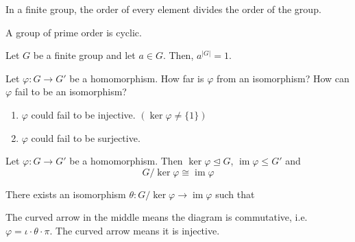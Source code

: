 \documentclass{mathnotes}
\DeclareMathOperator{\im}{im}
\begin{document}
\begin{cor}
  In a finite group, the order of every element divides the order of the group.
\end{cor}

\begin{cor}
  A group of prime order is cyclic.
\end{cor}

\begin{cor}
  Let $G$ be a finite group and let $a\in G$. Then, $a^{|G|}=1$.
\end{cor}

Let $\varphi:G\to G'$ be a homomorphism. How far is $\varphi$ from an
isomorphism? How can $\varphi$ fail to be an isomorphism?
\begin{enumerate}
  \item $\varphi$ could fail to be injective. $(\ker\varphi\ne\{1\})$
  \item $\varphi$ could fail to be surjective.
\end{enumerate}

\begin{bthm}
  Let $\varphi:G\to G'$ be a homomorphism. Then $\ker\varphi\unlhd G$,
  $\im\varphi\le G'$ and
  $$G/\ker\varphi\cong\im\varphi$$
\end{bthm}

\begin{prop}
  There exists an isomorphism $\theta:G/\ker\varphi\to \im\varphi$ such that
  \begin{center}
  \end{center}
  The curved arrow in the middle means the diagram is commutative, i.e.
  $\varphi=\iota\cdot\theta\cdot\pi$. The curved arrow means it is injective.
\end{prop}
\end{document}
